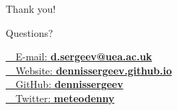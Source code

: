 \documentclass[10pt]{beamer}
\newcommand{\emailsymbol}   {\faEnvelope~~}  %
\newcommand{\homepagesymbol}{\faGlobe~~}  %
\newcommand{\twittersymbol} {\faTwitter~~}
\newcommand{\githubsymbol}  {\faGithub~~}
\begin{document}
{
\begin{frame}{Thank you!}

{\Huge Questions?}
\vspace{2cm}

\href{mailto:d.sergeev@uea.ac.uk}{\emailsymbol \small{E-mail:} \textbf{d.sergeev@uea.ac.uk}}\\
\href{https://dennissergeev.github.io}{\homepagesymbol \small{Website:} \textbf{dennissergeev.github.io}}\\
\href{http://github.com/dennissergeev}{\githubsymbol \small{GitHub:} \textbf{dennissergeev}}\\
\href{http://twitter.com/meteodenny}{\twittersymbol \small{Twitter:} \textbf{meteodenny}}
\end{frame}
}









\end{document}
